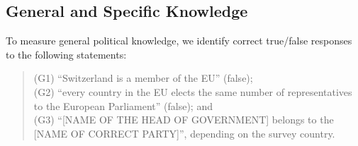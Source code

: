 \documentclass[12pt,halfline,a4paper,]{ouparticle}
\begin{document}
\begin{table}

\caption{\label{tab:tab1}Demographic details of the sample}
\centering
{}
\end{table}

\hypertarget{general-and-specific-knowledge}{%
\subsection{General and Specific
Knowledge}\label{general-and-specific-knowledge}}

To measure general political knowledge, we identify correct true/false
responses to the following statements:

\begin{quote}
(G1) ``Switzerland is a member of the EU'' (false);\\
(G2) ``every country in the EU elects the same number of representatives
to the European Parliament'' (false); and\\
(G3) ``{[}NAME OF THE HEAD OF GOVERNMENT{]} belongs to the {[}NAME OF
CORRECT PARTY{]}'', depending on the survey country.
\end{quote}
\end{document}
